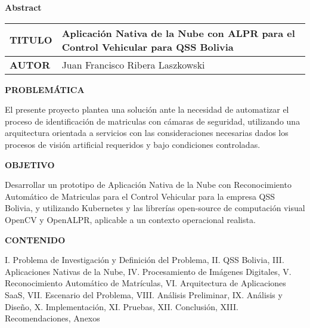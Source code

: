 {
\thispagestyle{first-pages}

\Large \textbf{Abstract}
\normalsize
\capstartfalse
\begin{table}[h]
\begin{center}
\renewcommand{\arraystretch}{0.8}%
\begin{tabular}{| >{\centering\arraybackslash}m{1in} | >{\centering\arraybackslash}m{4in} |}
\hline
\vspace{0.1cm}
\textbf{TITULO}  & Aplicación Nativa de la Nube con ALPR para el Control Vehicular para QSS Bolivia \\ \hline
\vspace{0.1cm}
\textbf{AUTOR}  & Juan Francisco Ribera Laszkowski \\ \hline

\end{tabular}
\label{tabular:UKJPNdata}
\end{center}
\end{table}

\textbf{PROBLEMÁTICA}

El presente proyecto plantea una solución ante la necesidad de automatizar el proceso de identificación de matriculas con cámaras de seguridad, utilizando una arquitectura orientada a servicios con las consideraciones necesarias dados los procesos de visión artificial requeridos y bajo condiciones controladas.

\textbf{OBJETIVO}

Desarrollar un prototipo de Aplicación Nativa de la Nube con Reconocimiento Automático de Matriculas para el Control Vehicular para la empresa QSS Bolivia, y utilizando Kubernetes y las librerías open-source de computación visual OpenCV y OpenALPR, aplicable a un contexto operacional realista.

\textbf{CONTENIDO}

I. Problema de Investigación y Definición del Problema, II. QSS Bolivia, III. Aplicaciones Nativas de la Nube, IV. Procesamiento de Imágenes Digitales, V. Reconocimiento Automático de Matrículas, VI. Arquitectura de Aplicaciones SaaS, VII. Escenario del Problema, VIII. Análisis Preliminar, IX. Análisis y Diseño, X. Implementación, XI. Pruebas, XII. Conclusión, XIII. Recomendaciones, Anexos
\capstartfalse
\begin{table}[h]
\begin{center}
\renewcommand{\arraystretch}{0.8}%
\begin{tabular}{| >{\centering\arraybackslash}m{1.5in} | >{\centering\arraybackslash}m{3.5in} |}
\hline


\end{tabular}
\end{center}
\end{table}}
